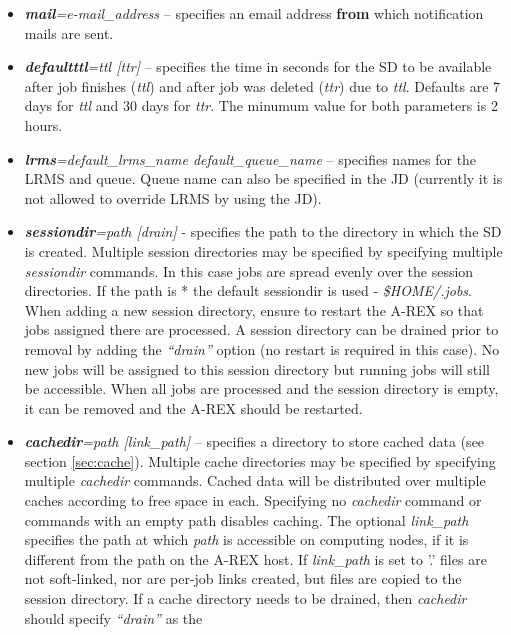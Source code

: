 \documentclass{article}                            %
\begin{document}
\begin{itemize}
\item \textbf{\textit{mail}}\textit{=e-mail\_address} -- specifies an email
address \textbf{from} which notification mails are sent.
\item \textbf{\textit{defaultttl}}\textit{=ttl {[}ttr]} -- specifies the
time in seconds for the SD to be available after job finishes (\emph{ttl})
and after job was deleted (\emph{ttr}) due to \emph{ttl}. Defaults
are 7 days for \emph{ttl} and 30 days for \emph{ttr}. The minumum value
for both parameters is 2 hours.
\item \textbf{\textit{lrms}}\textit{=default\_lrms\_name default\_queue\_name}
-- specifies names for the LRMS and queue. Queue name can also be specified
in the JD (currently it is not allowed to override LRMS by using
the JD).
\item \textbf{\textit{sessiondir}}\textit{=path [drain]} - specifies
  the path to the directory in which the SD is created. Multiple
  session directories may be specified by specifying multiple
  \emph{sessiondir} commands. In this case jobs are spread evenly over
  the session directories. If the path is {*} the default sessiondir
  is used - \textit{\$HOME/.jobs}. When adding a new session
  directory, ensure to restart the A-REX so that jobs assigned there
  are processed. A session directory can be drained prior to removal
  by adding the \emph{``drain''} option (no restart is required in
  this case). No new jobs will be assigned to this session directory
  but running jobs will still be accessible. When all jobs are
  processed and the session directory is empty, it can be removed and
  the A-REX should be restarted.
\item \textbf{\textit{cachedir}}\textit{=path {[}link\_path]} --
  specifies a directory to store cached data (see section
  \ref{sec:cache}). Multiple cache directories may be specified by
  specifying multiple \emph{cachedir} commands. Cached data will be
  distributed over multiple caches according to free space in
  each. Specifying no \emph{cachedir} command or commands with an
  empty path disables caching. The optional \textit{link\_path} specifies
  the path at which \emph{path} is accessible on computing nodes, if
  it is different from the path on the A-REX host. If
  \textit{link\_path} is set to '.'  files are not soft-linked, nor
  are per-job links created, but files are copied to the session
  directory. If a cache directory needs to be drained, then
  \emph{cachedir} should specify \emph{``drain''} as the

\end{itemize}
\end{document}
